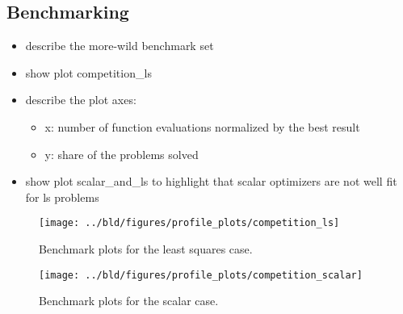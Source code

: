 \subsection{Benchmarking}
\label{subsec:benchmark-core-algo}
\begin{itemize}
    \item describe the more-wild benchmark set
    \item show plot competition\_ls
    \item describe the plot axes:
    \begin{itemize}
            \item x: number of function evaluations normalized by the best result
            \item y: share of the problems solved
        \end{itemize}
        \item show plot scalar\_and\_ls to highlight that scalar optimizers are not well fit for ls problems
    \end{itemize}


\begin{figure}
    \texttt{[image: ../bld/figures/profile\_plots/competition\_ls]}
    \caption{Benchmark plots for the least squares case.}
    \label{fig:core::benchmark-ls}
\end{figure}

\begin{figure}
    \texttt{[image: ../bld/figures/profile\_plots/competition\_scalar]}
    \caption{Benchmark plots for the scalar case.}
    \label{fig:core::benchmark-scalar}
\end{figure}

